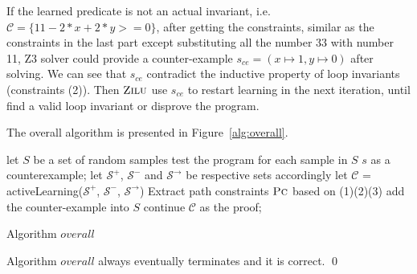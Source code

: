 If the learned predicate is not an actual invariant, i.e. $\mathcal{C} = \{11-2*x+2*y>=0\}$,
after getting the constraints, similar as the constraints in the last part except substituting all the number 33 with number 11, 
Z3 solver could provide a counter-example $s_{ce} = (x \mapsto 1, y \mapsto 0)$ after solving.
We can see that $s_{ce}$ contradict the inductive property of loop invariants (constraints (2)).
Then $\textsc{Zilu}$ use $s_{ce}$ to restart learning in the next iteration, until find a valid loop invariant or disprove the program.


 
The overall algorithm is presented in Figure~\ref{alg:overall}.
\begin{algorithm}[!h]
\SetAlgoVlined
\Indm
{}
\Indp
let $S$ be a set of random samples\;
 {
    test the program for each sample in $S$\;
     {
        \Return $s$ as a counterexample;
    }
    let $\mathcal{S}^+$, $\mathcal{S}^-$ and $\mathcal{S}^\rightarrow$ be respective sets accordingly\;
    let $\mathcal{C}$ = activeLearning($\mathcal{S}^+$, $\mathcal{S}^-$, $\mathcal{S}^\rightarrow$)\;
    Extract path constraints $\textsc{Pc}$ based on (1)(2)(3)\;
     {
         {
            add the counter-example into $S$\;
            continue\;
        }
    }
    \Return $\mathcal{C}$ as the proof;
}
\caption{Algorithm $overall$}
\label{alg:overall}
\end{algorithm}




\begin{theorem}
Algorithm $overall$ always eventually terminates and it is correct. \hfill \qed
\end{theorem}


